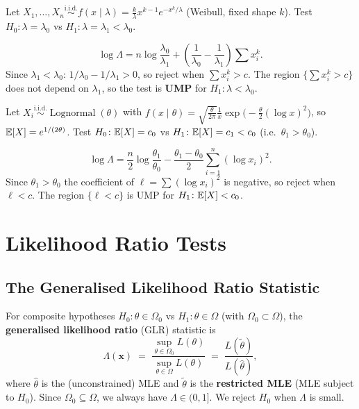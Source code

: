 \documentclass[11pt, a4paper]{article}
\newcommand{\iid}{\overset{\text{i.i.d.}}{\sim}}
\newcommand{\hth}{\hat{\theta}}
\newcommand{\tth}{\tilde{\theta}}
\begin{document}
\begin{exbox}
Let $X_1,\ldots,X_n \iid f(x \mid \lambda) = \frac{k}{\lambda}x^{k-1}e^{-x^k/\lambda}$ (Weibull, fixed shape $k$). Test $H_0\colon \lambda = \lambda_0$ vs $H_1\colon \lambda = \lambda_1 < \lambda_0$.

\[
  \log \Lambda = n\log\frac{\lambda_0}{\lambda_1} + \left(\frac{1}{\lambda_0} - \frac{1}{\lambda_1}\right)\sum x_i^k.
\]
Since $\lambda_1 < \lambda_0$: $1/\lambda_0 - 1/\lambda_1 > 0$, so reject when $\sum x_i^k > c$. The region $\{\sum x_i^k > c\}$ does not depend on $\lambda_1$, so the test is \textbf{UMP} for $H_1\colon \lambda < \lambda_0$.
\end{exbox}

\begin{exbox}
Let $X_i \iid \operatorname{Lognormal}(\theta)$ with $f(x \mid \theta) = \sqrt{\frac{\theta}{2\pi}}\frac{1}{x}\exp\!\bigl(-\frac{\theta}{2}(\log x)^2\bigr)$, so $\mathbb{E}[X] = e^{1/(2\theta)}$. Test $H_0\colon \mathbb{E}[X] = c_0$ vs $H_1\colon \mathbb{E}[X] = c_1 < c_0$ (i.e.\ $\theta_1 > \theta_0$).

\[
  \log \Lambda = \frac{n}{2}\log\frac{\theta_1}{\theta_0} - \frac{\theta_1 - \theta_0}{2}\sum_{i=1}^n (\log x_i)^2.
\]
Since $\theta_1 > \theta_0$ the coefficient of $\ell = \sum(\log x_i)^2$ is negative, so reject when $\ell < c$. The region $\{\ell < c\}$ is UMP for $H_1\colon \mathbb{E}[X] < c_0$.
\end{exbox}

\newpage
\section{Likelihood Ratio Tests}

\subsection*{The Generalised Likelihood Ratio Statistic}

\begin{defbox}
For composite hypotheses $H_0\colon \theta \in \Omega_0$ vs $H_1\colon \theta \in \Omega$ (with $\Omega_0 \subset \Omega$), the \textbf{generalised likelihood ratio} (GLR) statistic is
\[
  \Lambda(\mathbf{x}) \;=\;
  \frac{\sup_{\theta \in \Omega_0} L(\theta)}{\sup_{\theta \in \Omega} L(\theta)}
  \;=\; \frac{L(\tth)}{L(\hth)},
\]
where $\hth$ is the (unconstrained) MLE and $\tth$ is the \textbf{restricted MLE} (MLE subject to $H_0$). Since $\Omega_0 \subseteq \Omega$, we always have $\Lambda \in (0,1]$. We reject $H_0$ when $\Lambda$ is small.
\end{defbox}
\end{document}
